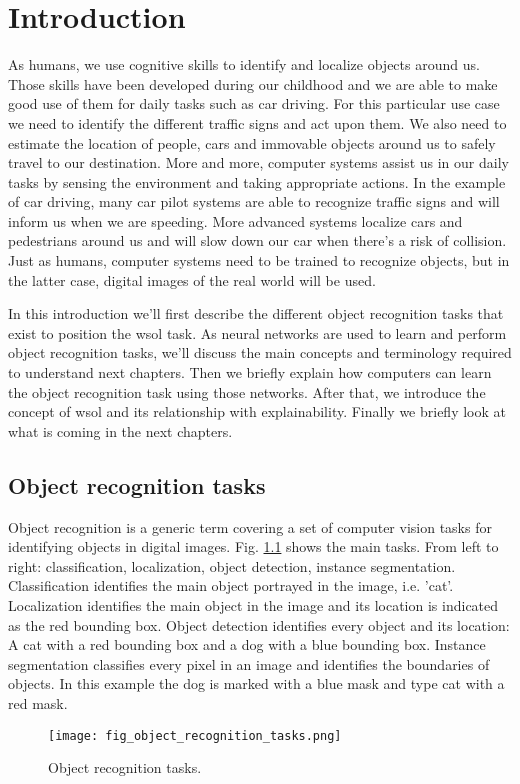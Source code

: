 \chapter{Introduction}

As humans, we use cognitive skills to identify and localize objects around us. Those skills have been developed during our childhood and we are able to make good use of them for daily tasks such as car driving. For this particular use case we need to identify the different traffic signs and act upon them. We also need to estimate the location of people, cars and immovable objects around us to safely travel to our destination. More and more, computer systems assist us in our daily tasks by sensing the environment and taking appropriate actions. In the example of car driving, many car pilot systems are able to recognize traffic signs and will inform us when we are speeding. More advanced systems localize cars and pedestrians around us and will slow down our car when there's a risk of collision. Just as humans, computer systems need to be trained to recognize objects, but in the latter case, digital images of the real world will be used.

In this introduction we'll first describe the different object recognition tasks that exist to position the \acrfull{wsol} task. As neural networks are used to learn and perform object recognition tasks, we'll discuss the main concepts and terminology required to understand next chapters. Then we briefly explain how computers can learn the object recognition task using those networks. After that, we introduce the concept of \acrlong{wsol} and its relationship with explainability. Finally we briefly look at what is coming in the next chapters.

\section{Object recognition tasks}
Object recognition is a generic term covering a set of computer vision tasks for identifying objects in digital images. Fig. \ref{fig:object_recognition_tasks} shows the main tasks. From left to right: classification, localization, object detection, instance segmentation. Classification identifies the main object portrayed in the image, i.e. 'cat'. Localization identifies the main object in the image and its location is indicated as the red bounding box. Object detection identifies every object and its location: A cat with a red bounding box and a dog with a blue bounding box. Instance segmentation classifies every pixel in an image and identifies the boundaries of objects. In this example the dog is marked with a blue mask and type cat with a red mask.
\begin{figure}[ht]
    \texttt{[image: fig\_object\_recognition\_tasks.png]}
    \caption{Object recognition tasks.}
    \label{fig:object_recognition_tasks}
\end{figure}

